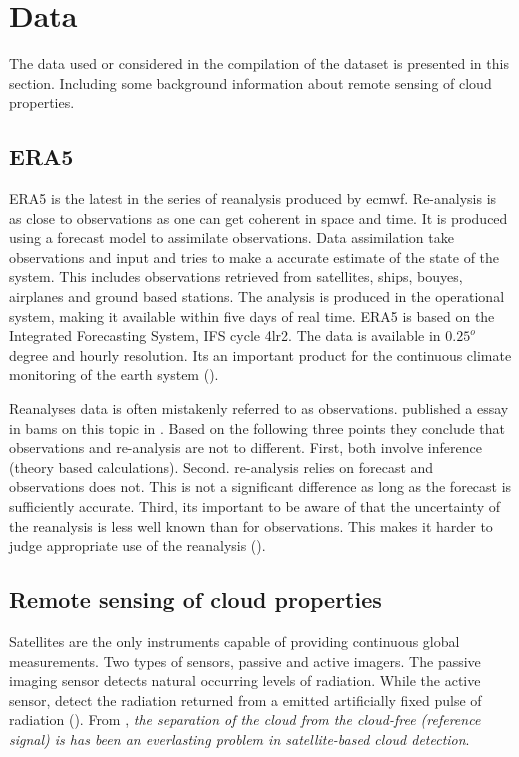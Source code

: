 
\section{Data}
The data used or considered in the compilation of the dataset is presented in this section. Including some background information about remote sensing of cloud properties. 

\subsection{ERA5} \label{sec:era5}
ERA5 is the latest in the series of reanalysis produced by \acrfull{ecmwf}. Re-analysis is as close to observations as one can get coherent in space and time. It is produced using a forecast model to assimilate observations. Data assimilation take observations and input and tries to make a accurate estimate of the state of the system. This includes observations retrieved from satellites, ships, bouyes, airplanes and ground based stations. The analysis is produced in the operational system, making it available within five days of real time. ERA5 is based on the Integrated Forecasting System, IFS cycle 4lr2. The data is available in $0.25^o$ degree and hourly resolution. Its an important product for the continuous climate monitoring of the earth system (\cite{Hersbach2018OperationalStatus}).

Reanalyses data is often mistakenly referred to as observations. \citeauthor{Parker2016ReanalysesDifference} published a essay in \acrfull{bams} on this topic in \citeyear{Parker2016ReanalysesDifference} . Based on the following three points they conclude that observations and re-analysis are not to different. First, both involve inference (theory based calculations). Second. re-analysis relies on forecast and observations does not. This is not a significant difference as long as the forecast is sufficiently accurate. Third, its important to be aware of that the uncertainty of the reanalysis is less well known than for observations. This makes it harder to judge appropriate use of the reanalysis (\cite{Parker2016ReanalysesDifference}). 

\subsection{Remote sensing of cloud properties}
Satellites are the only instruments capable of providing continuous global measurements. Two types of sensors, passive and active imagers. The passive imaging sensor detects natural occurring levels of radiation. While the active sensor,  detect the radiation returned from a emitted artificially fixed pulse of radiation (\cite{Stephens2018CloudsatSystem}). From \cite{Stockli2019CloudApplications}, \textit{the separation of the cloud from the cloud-free (reference signal) is has been an everlasting problem in satellite-based cloud detection}.


